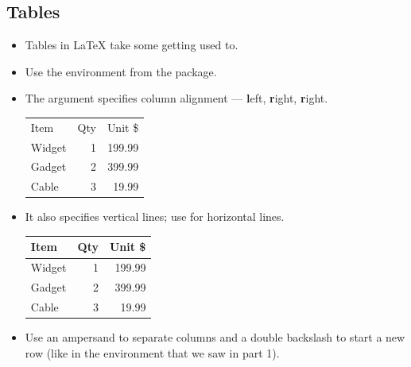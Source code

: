\documentclass[aspectratio=169]{beamer}
\begin{document}
\subsection{Tables}
\begin{frame}[fragile]{\insertsubsection}
\begin{itemize}
\item Tables in \LaTeX{} take some getting used to.
\item Use the  environment from the  package.
\item The argument specifies column alignment --- \textbf{l}eft, \textbf{r}ight, \textbf{r}ight.
\begin{exampletwouptiny}
\begin{tabular}{lrr}
Item   & Qty & Unit \$ \\
Widget & 1   & 199.99  \\
Gadget & 2   & 399.99  \\
Cable  & 3   & 19.99   \\
\end{tabular}
\end{exampletwouptiny}
\item It also specifies vertical lines; use  for horizontal lines.
\begin{exampletwouptiny}
\begin{tabular}{|l|r|r|} \hline
Item   & Qty & Unit \$ \\\hline
Widget & 1   & 199.99  \\
Gadget & 2   & 399.99  \\
Cable  & 3   & 19.99   \\\hline
\end{tabular}
\end{exampletwouptiny}
\item Use an ampersand \keystrokebftt{\&} to separate columns and a double backslash \keystrokebftt{\bs}\keystrokebftt{\bs} to start a new row (like in the  environment that we saw in part 1).
\end{itemize}
\end{frame}

\end{document}
